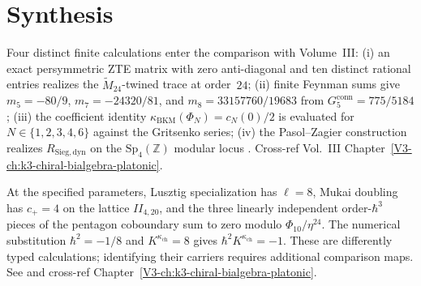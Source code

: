 \section{Synthesis}
\label{sec:cm-supplement}

\begin{remark}
\label{rem:cm-1}
Four distinct finite calculations enter the comparison with Volume~III:
(i) an exact persymmetric ZTE matrix with zero anti-diagonal and ten
distinct rational entries realizes the $\widetilde M_{24}$-twined
trace at order~$24$;
(ii) finite Feynman sums give $m_5=-80/9$, $m_7=-24320/81$, and
$m_8=33157760/19683$ from $G_5^{\mathrm{conn}}=775/5184$;
(iii) the coefficient identity
$\kappa_{\mathrm{BKM}}(\Phi_N)=c_N(0)/2$ is evaluated for
$N\in\{1,2,3,4,6\}$ against the Gritsenko series;
(iv) the Pasol--Zagier construction realizes
$R_{\mathrm{Sieg,dyn}}$ on the $\mathrm{Sp}_4(\mathbb Z)$ modular locus
\cite{PasolZagier2013,Gritsenko1999,Borcherds1992}.
Cross-ref Vol.~III Chapter~\ref{V3-ch:k3-chiral-bialgebra-platonic}.
\end{remark}

\begin{remark}
\label{rem:cm-2}
At the specified parameters, Lusztig specialization has $\ell=8$,
Mukai doubling has $c_+=4$ on the lattice $II_{4,20}$, and the three
linearly independent order-$\hbar^3$ pieces of the pentagon
coboundary sum to zero modulo $\Phi_{10}/\eta^{24}$.  The numerical
substitution $\hbar^2=-1/8$ and $K^{\kappa_{\mathrm{ch}}}=8$ gives
$\hbar^2K^{\kappa_{\mathrm{ch}}}=-1$.  These are differently typed
calculations; identifying their carriers requires additional comparison
maps.  See \cite{Mukai1987,Lusztig1990,EtingofKazhdan2007PartV} and
cross-ref
Chapter~\ref{V3-ch:k3-chiral-bialgebra-platonic}.
\end{remark}

